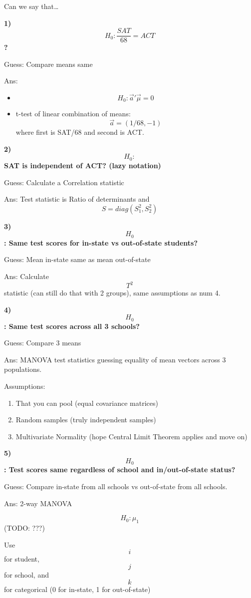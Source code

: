 \documentclass[]{article}
\providecommand{\tightlist}{%
  \setlength{\itemsep}{0pt}\setlength{\parskip}{0pt}}
\begin{document}
Can we say that\ldots{}

\textbf{1)} \[H_0: \frac{SAT}{68} = ACT\] \textbf{?}

Guess: Compare means same

Ans:

\begin{itemize}
\tightlist
\item
  \[H_0: \vec{a}'\vec{\mu} = 0\]
\item
  t-test of linear combination of means: \[ \vec{a} = (1/68, -1)\]where
  first is SAT/68 and second is ACT.
\end{itemize}

\textbf{2)} \[H_0:\] \textbf{SAT is independent of ACT? (lazy notation)}

Guess: Calculate a Correlation statistic

Ans: Test statistic is Ratio of determinants and
\[ S = diag(S_1^2, S_2^2) \]

\textbf{3)} \[H_0\]\textbf{: Same test scores for in-state vs
out-of-state students?}

Guess: Mean in-state same as mean out-of-state

Ans: Calculate \[T^2\] statistic (can still do that with 2 groups), same
assumptions as num 4.

\textbf{4)} \[H_0\]\textbf{: Same test scores across all 3 schools?}

Guess: Compare 3 means

Ans: MANOVA test statistics guessing equality of mean vectors across 3
populations.

Assumptions:

\begin{enumerate}
\def\labelenumi{\arabic{enumi}.}
\item
  That you can pool (equal covariance matrices)
\item
  Random samples (truly independent samples)
\item
  Multivariate Normality (hope Central Limit Theorem applies and move
  on)
\end{enumerate}

\textbf{5)} \[H_0\]\textbf{: Test scores same regardless of school and
in/out-of-state status?}

Guess: Compare in-state from all schools vs out-of-state from all
schools.

Ans: 2-way MANOVA

\[H_0: \mu_1 \] (TODO: ???)

Use \[i\] for student, \[j\] for school, and \[k\] for categorical (0
for in-state, 1 for out-of-state)
\end{document}

